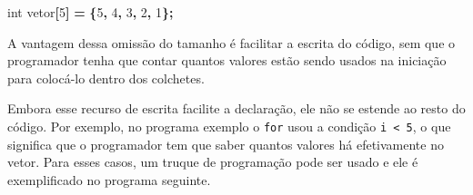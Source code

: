 \documentclass[
  11pt,
  a4paper,
]{scrbook}
\newenvironment{Shaded}{\begin{snugshade}}{\end{snugshade}}
\newcommand{\DataTypeTok}[1]{\textcolor[rgb]{0.13,0.29,0.53}{#1}}
\newcommand{\DecValTok}[1]{\textcolor[rgb]{0.00,0.00,0.81}{#1}}
\newcommand{\NormalTok}[1]{#1}
\newcommand{\OperatorTok}[1]{\textcolor[rgb]{0.81,0.36,0.00}{\textbf{#1}}}
\begin{document}
\begin{Shaded}
\begin{Highlighting}[]
\DataTypeTok{int}\NormalTok{ vetor}\OperatorTok{[}\DecValTok{5}\OperatorTok{]} \OperatorTok{=} \OperatorTok{\{}\DecValTok{5}\OperatorTok{,} \DecValTok{4}\OperatorTok{,} \DecValTok{3}\OperatorTok{,} \DecValTok{2}\OperatorTok{,} \DecValTok{1}\OperatorTok{\};}
\end{Highlighting}
\end{Shaded}

A vantagem dessa omissão do tamanho é facilitar a escrita do código, sem
que o programador tenha que contar quantos valores estão sendo usados na
iniciação para colocá-lo dentro dos colchetes.

Embora esse recurso de escrita facilite a declaração, ele não se estende
ao resto do código. Por exemplo, no programa exemplo o \texttt{for} usou
a condição \texttt{i\ \textless{}\ 5}, o que significa que o programador
tem que saber quantos valores há efetivamente no vetor. Para esses
casos, um truque de programação pode ser usado e ele é exemplificado no
programa seguinte.
\end{document}
